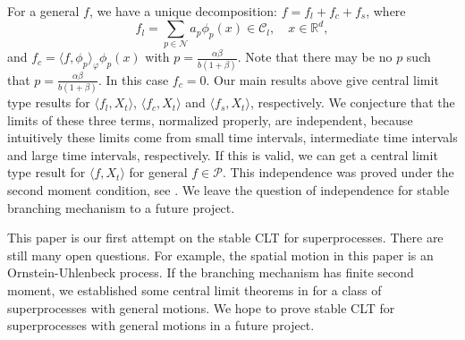 \documentclass[12pt,a4paper]{amsart}
\theoremstyle{plain}
\theoremstyle{definition}
\numberwithin{equation}{section}
\begin{document}
    For a general $f$, we have a unique decomposition: $f=f_l+f_c+f_s$, where $$f_l=\sum_{p\in \mathcal{N}}a_p\phi_p(x)\in \mathcal{C}_l,\quad x\in \mathbb{R}^d,$$
 and $f_c=\langle f, \phi_p\rangle_{\varphi} \phi_p(x)$  with $p=\frac{\alpha\beta}{b(1+\beta)}$. Note that there may be no $p$ such that $p=\frac{\alpha\beta}{b(1+\beta)}$. In this case $f_c=0$. 
Our main results above give central limit type results for $\langle f_l, X_t\rangle$, $\langle f_c, X_t\rangle$ and $\langle f_s, X_t\rangle$, respectively.
 We conjecture that the limits of these three terms, normalized properly, are independent, because intuitively these limits come from small time intervals, intermediate time intervals and large time intervals, respectively. 
 If this is valid, we can get a central limit type result for $\langle f, X_t\rangle$ for general $f\in\mathcal{P}$. 
 This independence was proved under the second moment condition, see \cite{RenSongZhang2015Central}. 
 We leave the question of independence for stable branching mechanism to a future project.

    This paper is our first attempt on the stable CLT for superprocesses. 
    There are still many open questions. 
    For example, the spatial motion in this paper is an Ornstein-Uhlenbeck process. 
    If the branching mechanism has finite second moment, we established some central limit theorems in \cite{RenSongZhang2015Central} for a class of superprocesses with general motions. 
    We hope to prove stable CLT for superprocesses with general motions in a future project.
\end{document}

